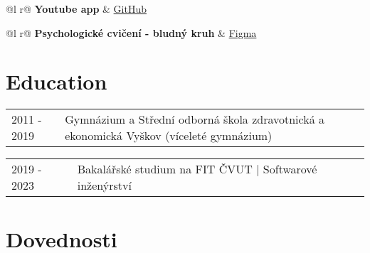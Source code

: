 \documentclass[a4paper,12pt]{article}
\begin{document}
\begin{tabularx}{\linewidth}{ @{}l r@{} }
\textbf{Youtube app} & \hfill \href{https://github.com/suchomelova-dana/Youtube-clone-App}{GitHub} \\[3.75pt]
\end{tabularx}




\begin{tabularx}{\linewidth}{ @{}l r@{} }
\textbf{Psychologické cvičení - bludný kruh} & \hfill \href{https://www.figma.com/file/FFQuMzcxBgAm4RXJvZzPVw/Mindwell\?type=design\&node-id=0\%3A1\&mode=design\&t=fDZXMS0PFdsedC3R-1}{Figma} \\[3.75pt]
\end{tabularx}


\section{Education}
\begin{tabularx}{\linewidth}{@{}l X@{}}
2011 - 2019 & Gymnázium a Střední odborná škola zdravotnická a ekonomická Vyškov (víceleté gymnázium)
\end{tabularx}

\begin{tabularx}{\linewidth}{@{}l X@{}}	
2019 - 2023 & Bakalářské studium na FIT ČVUT | Softwarové inženýrství \\
\end{tabularx}


\section{Dovednosti}
\end{document}
